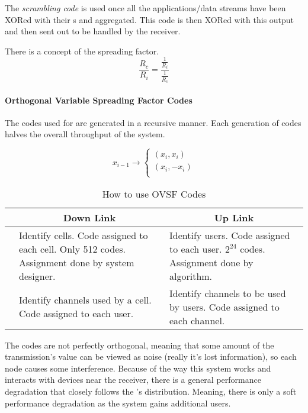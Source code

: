 \begin{definition}\label{def:Scrambling_Code}
  The \emph{scrambling code} is used once all the applications/data streams have been XORed with their s and aggregated.
  This code is then XORed with this output and then sent out to be handled by the receiver.
\end{definition}

There is a concept of the spreading factor.
\begin{equation}\label{eq:Spreading_Factor}
  \frac{R_{c}}{R_{i}} = \frac{\frac{1}{R_{i}}}{\frac{1}{R_{c}}}
\end{equation}

\paragraph{Orthogonal Variable Spreading Factor Codes}\label{par:OVSF_Codes}
The codes used for  are generated in a recursive manner.
Each generation of codes halves the overall throughput of the system.

\begin{equation}\label{eq:OVSF_Codes}
  x_{i-1} \rightarrow
  \begin{cases}
    (x_{i}, x_{i}) \\
    (x_{i}, -x_{i}) \\
  \end{cases}
\end{equation}

\begin{table}[h!]
  \centering
  \begin{tabular}{c|p{4cm}p{4cm}}
    \toprule
    & \multicolumn{1}{c}{Down Link} & \multicolumn{1}{c}{Up Link} \\
    \midrule
    \nameref{def:Scrambling_Code} & Identify cells. Code assigned to each cell. Only 512 codes. Assignment done by system designer. & Identify users. Code assigned to each user. $2^{24}$ codes. Assignment done by algorithm. \\
    \nameref{def:Spreading_Code} & Identify channels used by a cell. Code assigned to each user. & Identify channels to be used by users. Code assigned to each channel.
  \end{tabular}
  \caption{How to use OVSF Codes}
  \label{tab:Use_OVSF_Codes}
\end{table}

The codes are not perfectly orthogonal, meaning that some amount of the transmission's value can be viewed as noise (really it's lost information), so each node causes some interference.
Because of the way this system works and interacts with devices near the receiver, there is a general performance degradation that closely follows the 's distribution.
Meaning, there is only a soft performance degradation as the system gains additional users.

